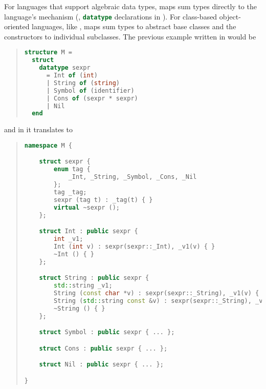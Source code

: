 For languages that support algebraic data types, \asdlgen{} maps sum types directly
to the language's mechanism (\eg{}, \lstinline[language=SML]!datatype! declarations
in \sml{}).
For class-based object-oriented languages, like \Cplusplus{}, \asdlgen{} maps
sum types to abstract base classes and the constructors to individual subclasses.
The previous example written in \sml{} would be
\begin{quote}\begin{lstlisting}[language=SML]
structure M =
  struct
    datatype sexpr
      = Int of (int)
      | String of (string)
      | Symbol of (identifier)
      | Cons of (sexpr * sexpr)
      | Nil
  end
\end{lstlisting}\end{quote}%
and in \Cplusplus{} it translates to
\begin{quote}\begin{lstlisting}[language=c++]
namespace M {

    struct sexpr {
        enum tag {
            _Int, _String, _Symbol, _Cons, _Nil
        };
        tag _tag;
        sexpr (tag t) : _tag(t) { }
        virtual ~sexpr ();
    };

    struct Int : public sexpr {
        int _v1;
        Int (int v) : sexpr(sexpr::_Int), _v1(v) { }
        ~Int () { }
    };

    struct String : public sexpr {
        std::string _v1;
        String (const char *v) : sexpr(sexpr::_String), _v1(v) { }
        String (std::string const &v) : sexpr(sexpr::_String), _v1(v) { }
        ~String () { }
    };

    struct Symbol : public sexpr { ... };

    struct Cons : public sexpr { ... };

    struct Nil : public sexpr { ... };

}
\end{lstlisting}\end{quote}%
